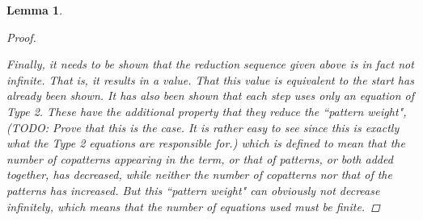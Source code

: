\documentclass[11pt]{article} %
\newtheorem{lemma}{Lemma}
\begin{document}
\begin{lemma}
\begin{proof}
\begin{itemize}
\end{itemize}

Finally, it needs to be shown that the reduction sequence given above is in fact not infinite. That is, it results in a value. That this value is equivalent to the start has already been shown. It has also been shown that each step uses only an equation of Type 2. These have the additional property that they reduce the ``pattern weight", (TODO: Prove that this is the case. It is rather easy to see since this is exactly what the Type 2 equations are responsible for.) which is defined to mean that the number of copatterns appearing in the term, or that of patterns, or both added together, has decreased, while neither the number of copatterns nor that of the patterns has increased. But this ``pattern weight" can obviously not decrease infinitely, which means that the number of equations used must be finite.

\end{proof}

\end{lemma}
\end{document}
